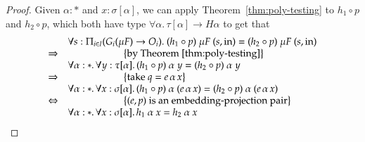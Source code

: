 \documentclass{article}[12 pt]
\newcommand{\eqAnnotation}[1]{\hspace{2cm}\left\{\textrm{#1}\right\}}
\theoremstyle{problemstyle}
\begin{document}
\begin{proof}
  Given $\alpha : *$ and $x : \sigma[\alpha]$, we can apply
  Theorem~\ref{thm:poly-testing} to $h_1\circ p$ and $h_2 \circ p$,
  which both have type $\forall \alpha. \,\tau[\alpha] 
  \rightarrow H\alpha$ to get that
  \begin{displaymath}
    \begin{array}{cl}
      & \forall s : \Pi_{i \in I}(G_i(\mu F) \to O_i).~(h_1 \circ
      p)~\mu F~(s, \mathrm{in}) = (h_2 \circ p)~\mu F~(s,
      \mathrm{in})\\ 
      \Rightarrow&\eqAnnotation{by Theorem~\ref{thm:poly-testing}}\\
      & \forall \alpha : *.\, \forall y : \tau[\alpha] .\, (h_1 \circ
      p)~\alpha~y = (h_2 \circ p)~\alpha~y\\
      \Rightarrow&\eqAnnotation{take $q = e \,\alpha \,x$}\\
      & \forall \alpha : *. \,\forall x : \sigma[\alpha].\, (h_1 \circ
      p)~\alpha~(e \, \alpha\, x) = (h_2 \circ p)~\alpha~(e \,
      \alpha\, x)\\ 
      \Leftrightarrow&\eqAnnotation{$(e,p)$ is an embedding-projection
        pair}\\ 
      & \forall \alpha : *.\, \forall x : \sigma[\alpha].\, h_1~\alpha~x =
      h_2~\alpha~x 
    \end{array}
  \end{displaymath}
\end{proof}
\end{document}
